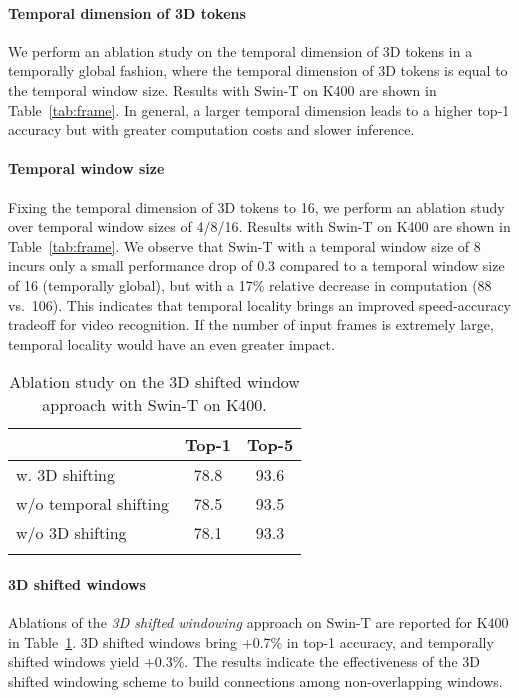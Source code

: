 \documentclass{article}
\begin{document}
\paragraph{Temporal dimension of 3D tokens} We perform an ablation study on the temporal dimension of 3D tokens in a temporally global fashion, where the temporal dimension of 3D tokens is equal to the temporal window size. Results with Swin-T on K400 are shown in Table~\ref{tab:frame}. In general, a larger temporal dimension leads to a higher top-1 accuracy but with greater computation costs and slower inference.


\paragraph{Temporal window size} Fixing the temporal dimension of 3D tokens to 16, we perform an ablation study over temporal window sizes of 4/8/16. Results with Swin-T on K400 are shown in Table~\ref{tab:frame}. We observe that Swin-T with a temporal window size of 8 incurs only a small performance drop of 0.3 compared to a temporal window size of 16 (temporally global), but with a 17\% relative decrease in computation (88 vs.~106). This indicates that temporal locality brings an improved speed-accuracy tradeoff for video recognition. If the number of input frames is extremely large, temporal locality would have an even greater impact.

\begin{table}[h]
    \centering
    \caption{Ablation study on the 3D shifted window approach with Swin-T on K400.}
\centering
  \begin{tabular}{l|cc}
  \Xhline{1.0pt}
  & Top-1 & Top-5 \\
  \hline
  w. 3D shifting & 78.8 & 93.6 \\
  w/o temporal shifting & 78.5 & 93.5 \\
  w/o 3D shifting & 78.1 & 93.3 \\
  \Xhline{1.0pt}
  \end{tabular}
  \label{tab:shift}
  \end{table}



\paragraph{3D shifted windows} Ablations of the \emph{3D shifted windowing} approach on Swin-T are reported for K400 in Table~\ref{tab:shift}. 3D shifted windows bring +0.7\% in top-1 accuracy, and temporally shifted windows yield +0.3\%. The results indicate the effectiveness of the 3D shifted windowing scheme to build connections among non-overlapping windows.
\end{document}
